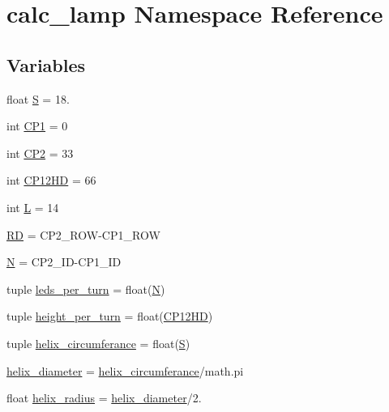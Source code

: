 \hypertarget{namespacecalc__lamp}{}\section{calc\+\_\+lamp Namespace Reference}
\label{namespacecalc__lamp}
\subsection*{Variables}
\begin{DoxyCompactItemize}
\item 
float \hyperlink{namespacecalc__lamp_a67f8a48b282bb1df37dbef674da6c70c}{S} = 18.
\item 
int \hyperlink{namespacecalc__lamp_ad2861843e3b50107a862fff119d14706}{C\+P1} = 0
\item 
int \hyperlink{namespacecalc__lamp_a7fc1ee52891484d78fe8e1387481ab35}{C\+P2} = 33
\item 
int \hyperlink{namespacecalc__lamp_aa57e6acb391a62bc6a5e0e2b0583b523}{C\+P12\+H\+D} = 66
\item 
int \hyperlink{namespacecalc__lamp_a61c0b95cbaf24598117340c745f06cb5}{L} = 14
\item 
\hyperlink{namespacecalc__lamp_a24423a34de7058a469e65e72013909e3}{R\+D} = C\+P2\+\_\+\+R\+O\+W-\/C\+P1\+\_\+\+R\+O\+W
\item 
\hyperlink{namespacecalc__lamp_a9fcf41a6d23f2cb5a91b8f0662ade78e}{N} = C\+P2\+\_\+\+I\+D-\/C\+P1\+\_\+\+I\+D
\item 
tuple \hyperlink{namespacecalc__lamp_aa3ded2a7a642f31bc04b9a2390e87f2c}{leds\+\_\+per\+\_\+turn} = float(\hyperlink{namespacecalc__lamp_a9fcf41a6d23f2cb5a91b8f0662ade78e}{N})
\item 
tuple \hyperlink{namespacecalc__lamp_aae862acf48d47d29de10038c66c88186}{height\+\_\+per\+\_\+turn} = float(\hyperlink{namespacecalc__lamp_aa57e6acb391a62bc6a5e0e2b0583b523}{C\+P12\+H\+D})
\item 
tuple \hyperlink{namespacecalc__lamp_a9992b66c8618f2824a778cc98e6e95b3}{helix\+\_\+circumferance} = float(\hyperlink{namespacecalc__lamp_a67f8a48b282bb1df37dbef674da6c70c}{S})
\item 
\hyperlink{namespacecalc__lamp_a4c2cdb9deaceccbc732e80467c88f8fa}{helix\+\_\+diameter} = \hyperlink{namespacecalc__lamp_a9992b66c8618f2824a778cc98e6e95b3}{helix\+\_\+circumferance}/math.\+pi
\item 
float \hyperlink{namespacecalc__lamp_a9fae0936f2cfe1102b12afe7d72667a6}{helix\+\_\+radius} = \hyperlink{namespacecalc__lamp_a4c2cdb9deaceccbc732e80467c88f8fa}{helix\+\_\+diameter}/2.

\end{DoxyCompactItemize}
